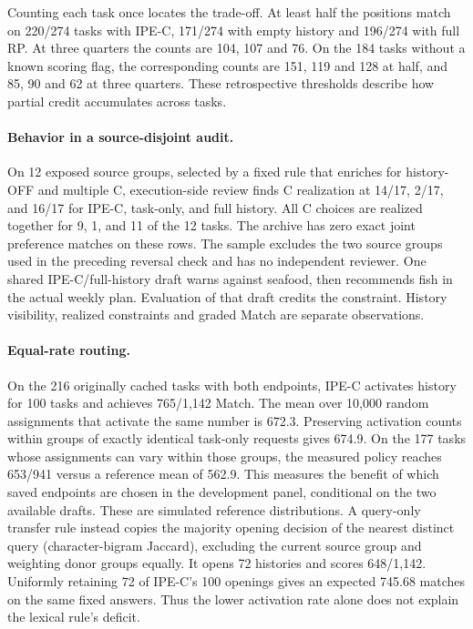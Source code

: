 \documentclass[11pt]{article}
\begin{document}
Counting each task once locates the trade-off. At least half the positions match on 220/274 tasks with IPE-C, 171/274 with empty history and 196/274 with full RP. At three quarters the counts are 104, 107 and 76. On the 184 tasks without a known scoring flag, the corresponding counts are 151, 119 and 128 at half, and 85, 90 and 62 at three quarters. These retrospective thresholds describe how partial credit accumulates across tasks.

\paragraph{Behavior in a source-disjoint audit.}
On 12 exposed source groups, selected by a fixed rule that enriches for history-OFF and multiple C, execution-side review finds C realization at 14/17, 2/17, and 16/17 for IPE-C, task-only, and full history. All C choices are realized together for 9, 1, and 11 of the 12 tasks. The archive has zero exact joint preference matches on these rows. The sample excludes the two source groups used in the preceding reversal check and has no independent reviewer. One shared IPE-C/full-history draft warns against seafood, then recommends fish in the actual weekly plan. Evaluation of that draft credits the constraint. History visibility, realized constraints and graded Match are separate observations.

\paragraph{Equal-rate routing.}
On the 216 originally cached tasks with both endpoints, IPE-C activates history for 100 tasks and achieves 765/1,142 Match. The mean over 10,000 random assignments that activate the same number is 672.3. Preserving activation counts within groups of exactly identical task-only requests gives 674.9. On the 177 tasks whose assignments can vary within those groups, the measured policy reaches 653/941 versus a reference mean of 562.9. This measures the benefit of which saved endpoints are chosen in the development panel, conditional on the two available drafts. These are simulated reference distributions. A query-only transfer rule instead copies the majority opening decision of the nearest distinct query (character-bigram Jaccard), excluding the current source group and weighting donor groups equally. It opens 72 histories and scores 648/1,142. Uniformly retaining 72 of IPE-C's 100 openings gives an expected 745.68 matches on the same fixed answers. Thus the lower activation rate alone does not explain the lexical rule's deficit.
\end{document}
